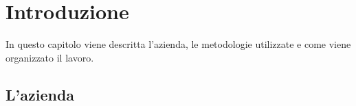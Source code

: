 
\chapter{Introduzione}
\label{cap:introduzione}

In questo capitolo viene descritta l'azienda, le metodologie utilizzate e come viene organizzato il lavoro. \\




\section{L'azienda}

